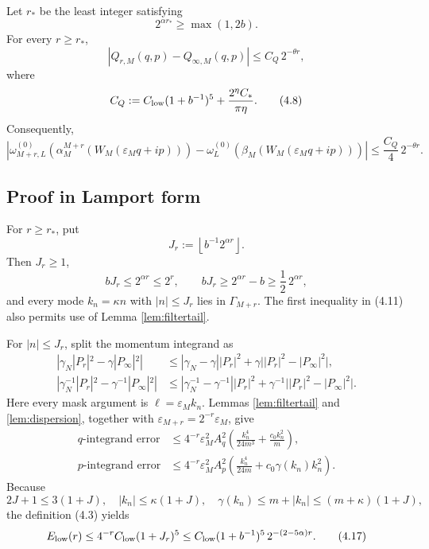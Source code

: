 \documentclass[11pt,a4paper]{article}
\newcommand{\eps}{\varepsilon}
\begin{document}
\begin{theorem}\label{thm:rate}
Let \(r_*\) be the least integer satisfying
\[
 2^{\alpha r_*}\ge\max(1,2b).                                 \tag{4.6}
\]
For every \(r\ge r_*\),
\[
 |Q_{r,M}(q,p)-Q_{\infty,M}(q,p)|
 \le C_Q\,2^{-\theta r},                                      \tag{4.7}
\]
where
\[
 C_Q:=C_{\rm low}(1+b^{-1})^5+\frac{2^\eta C_*}{\pi\eta}.      \tag{4.8}
\]
Consequently,
\[
 \left|
 \omega_{M+r,L}^{(0)}(\alpha_M^{M+r}(W_M(\eps_Mq+ip)))
 -\omega_L^{(0)}(\beta_M(W_M(\eps_Mq+ip)))
 \right|
 \le\frac{C_Q}{4}\,2^{-\theta r}.                             \tag{4.9}
\]
\end{theorem}

\subsection*{Proof in Lamport form}


For \(r\ge r_*\), put
\[
 J_r:=\left\lfloor b^{-1}2^{\alpha r}\right\rfloor.            \tag{4.10}
\]
Then \(J_r\ge1\),
\[
 bJ_r\le2^{\alpha r}\le2^r,\qquad
 bJ_r\ge2^{\alpha r}-b\ge\frac12\,2^{\alpha r},                \tag{4.11}
\]
and every mode \(k_n=\kappa n\) with \(|n|\le J_r\) lies in
\(\Gamma_{M+r}\).  The first inequality in (4.11) also permits use of
Lemma \ref{lem:filtertail}.


For \(|n|\le J_r\), split the momentum integrand as
\begin{align}
 |\gamma_N|P_r|^2-\gamma|P_\infty|^2|
 &\le|\gamma_N-\gamma||P_r|^2
 +\gamma\bigl||P_r|^2-|P_\infty|^2\bigr|,                     \tag{4.12}\\
 |\gamma_N^{-1}|P_r|^2-\gamma^{-1}|P_\infty|^2|
 &\le|\gamma_N^{-1}-\gamma^{-1}||P_r|^2
 +\gamma^{-1}\bigl||P_r|^2-|P_\infty|^2\bigr|.                \tag{4.13}
\end{align}
Here every mask argument is \(\ell=\eps_Mk_n\).  Lemmas
\ref{lem:filtertail} and \ref{lem:dispersion}, together with
\(\eps_{M+r}=2^{-r}\eps_M\), give
\begin{align}
 \text{\(q\)-integrand error}
 &\le4^{-r}\eps_M^2A_q^2
   \left(\frac{k_n^4}{24m^3}+\frac{c_0k_n^2}{m}\right),        \tag{4.14}\\
 \text{\(p\)-integrand error}
 &\le4^{-r}\eps_M^2A_p^2
   \left(\frac{k_n^4}{24m}+c_0\gamma(k_n)k_n^2\right).         \tag{4.15}
\end{align}
Because
\[
 2J+1\le3(1+J),\quad |k_n|\le\kappa(1+J),\quad
 \gamma(k_n)\le m+|k_n|\le(m+\kappa)(1+J),                    \tag{4.16}
\]
the definition (4.3) yields
\[
 E_{\rm low}(r)
 \le4^{-r}C_{\rm low}(1+J_r)^5
 \le C_{\rm low}(1+b^{-1})^5\,2^{-(2-5\alpha)r}.              \tag{4.17}
\]
\end{document}
